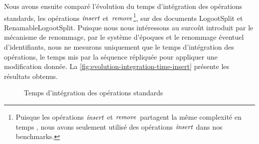 \label{sec:integration-time-standard-ops}

Nous avons ensuite comparé l'évolution du temps d'intégration des opérations standards, \ie les opérations $\mathit{insert}$ et $\mathit{remove}$\footnote{Puisque les opérations $\mathit{insert}$ et $\mathit{remove}$ partagent la même complexité en temps , nous avons seulement utilisé des opérations $\mathit{insert}$ dans nos benchmarks.}, sur des documents LogootSplit et RenamableLogootSplit.
Puisque nous nous intéressons au surcoût introduit par le mécanisme de renommage, \ie par le système d'époques et le renommage éventuel d'identifiants, nous ne mesurons uniquement que le temps d'intégration des opérations, \ie le temps mis par la séquence répliquée pour appliquer une modification donnée.
La \autoref{fig:evolution-integration-time-insert} présente les résultats obtenus.

\begin{figure}[!ht]
  \centering
  \hfil
  \caption{Temps d'intégration des opérations standards}
  \label{fig:evolution-integration-time-insert}
\end{figure}

